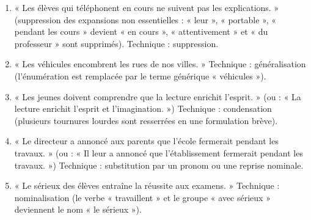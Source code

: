 \documentclass[11pt]{article}
\newcommand{\cle}[1]{{\popxbold\color{popdark}#1}}
\begin{document}
\begin{corrige}
\begin{enumerate}
\item « Les élèves qui téléphonent en cours ne suivent pas les explications. » (suppression des expansions non essentielles : « leur », « portable », « pendant les cours » devient « en cours », « attentivement » et « du professeur » sont supprimés). Technique : \cle{suppression}.
\item « Les véhicules encombrent les rues de nos villes. » Technique : \cle{généralisation} (l'énumération est remplacée par le terme générique « véhicules »).
\item « Les jeunes doivent comprendre que la lecture enrichit l'esprit. » (ou : « La lecture enrichit l'esprit et l'imagination. ») Technique : \cle{condensation} (plusieurs tournures lourdes sont resserrées en une formulation brève).
\item « Le directeur a annoncé aux parents que l'école fermerait pendant les travaux. » (ou : « Il leur a annoncé que l'établissement fermerait pendant les travaux. ») Technique : \cle{substitution} par un pronom ou une reprise nominale.
\item « Le sérieux des élèves entraîne la réussite aux examens. » Technique : \cle{nominalisation} (le verbe « travaillent » et le groupe « avec sérieux » deviennent le nom « le sérieux »).
\end{enumerate}
\end{corrige}
\end{document}
